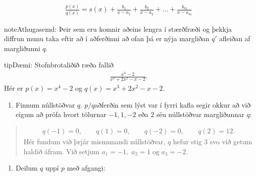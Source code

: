 \documentclass[a4paper,10pt,icelandic]{sphinxmanual}
\begin{document}
\begin{equation*}
\begin{split}\frac{p(x)}{q(x)}=s(x)+\frac{b_1}{x-a_1}+\frac{b_2}{x-a_2}+...+\frac{b_m}{x-a_m}\end{split}
\end{equation*}
\begin{sphinxadmonition}{note}{Athugasemd:}
Þeir sem eru komnir aðeins lengra í stærðfræði og þekkja diffrun munu taka eftir að í aðferðinni að ofan þá er nýja margliðan \(q'\) afleiðan af margliðunni \(q\).
\end{sphinxadmonition}

\begin{sphinxadmonition}{tip}{Dæmi:}
Stofnbrotaliðið ræða fallið
\begin{equation*}
\begin{split}\frac{x^4-2}{x^3+2x^2-x-2}.\end{split}
\end{equation*}
Hér er \(p(x)=x^4-2\) og \(q(x)=x^3+2x^2-x-2\).
\begin{enumerate}
%
\item {} 
Finnum núllstöðvar \(q\). \(p/q\)\sphinxhyphen{}aðferðin sem lýst var í fyrri kafla segir okkur að við eigum að prófa hvort tölurnar \(-1,1,-2\) eða \(2\) séu núllstöðvar margliðunnar \(q\):

\end{enumerate}
\begin{quote}
\begin{equation*}
\begin{split}q(-1)=0, \qquad q(1)=0, \qquad q(-2)=0, \qquad q(2)=12.\end{split}
\end{equation*}
Hér fundum við þrjár mismunandi núllstöðvar, \(q\) hefur stig \(3\) svo við getum haldið áfram. Við setjum \(a_1=-1, \; a_2=1 \; \text{og} \; a_3=-2\).
\end{quote}
\begin{enumerate}
%
\setcounter{enumi}{1}
\item {} 
Deilum \(q\) uppí \(p\) með afgangi:

\end{enumerate}
\begin{quote}



\end{quote}
\end{sphinxadmonition}
\end{document}
